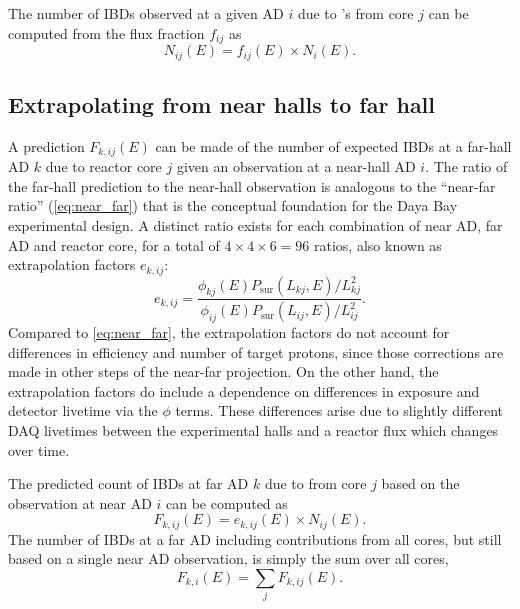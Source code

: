 The number of IBDs observed at a given AD $i$ due to \nuebar{}'s from core $j$
can be computed from the flux fraction $f_{ij}$ as
\begin{equation}\label{eq:num_ibds_from_core_ij}
    N_{ij}(E) = f_{ij}(E) \times N_i(E).
\end{equation}

\subsection{Extrapolating from near halls to far hall}
\label{subsec:extrapolation}

A prediction $F_{k,ij}(E)$ can be made of the number of expected IBDs
at a far-hall AD $k$ due to reactor core $j$
given an observation at a near-hall AD $i$.
The ratio of the far-hall prediction to the near-hall observation
is analogous to the ``near-far ratio'' (\cref{eq:near_far})
that is the conceptual foundation
for the Daya Bay experimental design.
A distinct ratio exists for each combination of near AD, far AD and reactor core,
for a total of $4 \times 4 \times 6 = 96$ ratios, also known as extrapolation factors
$e_{k,ij}$:
\begin{equation}\label{eq:extrapolation}
    e_{k,ij} = \frac{\phi_{kj}(E)P_\text{sur}(L_{kj}, E)/L_{kj}^2}{
        \phi_{ij}(E)P_\text{sur}(L_{ij}, E)/L_{ij}^2
    }.
\end{equation}
Compared to \cref{eq:near_far}, the extrapolation factors
do not account for differences in efficiency and number of target protons,
since those corrections are made in other steps of the near-far projection.
On the other hand, the extrapolation factors do include a dependence on
differences in \nuebar{} exposure and detector livetime via the $\phi$ terms.
These differences arise due to slightly different DAQ livetimes
between the experimental halls
and a reactor flux which changes over time.

The predicted count of IBDs at far AD $k$ due to \nuebar{} from core $j$
based on the observation at near AD $i$ can be computed as
\begin{equation}
    F_{k,ij}(E) = e_{k,ij}(E) \times N_{ij}(E).
\end{equation}
The number of IBDs at a far AD including contributions from all cores,
but still based on a single near AD observation,
is simply the sum over all cores,
\begin{equation}
    F_{k,i}(E) = \sum_j F_{k,ij}(E).
\end{equation}


